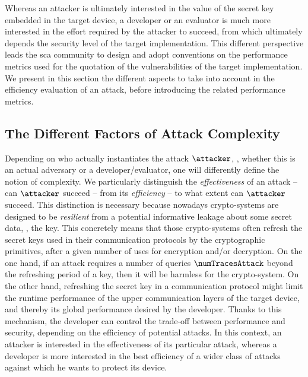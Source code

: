 Whereas an attacker is ultimately interested in the value of the secret key embedded in the target device, a developer or an evaluator is much more interested in the effort required by the attacker to succeed, from which ultimately depends the security level of the target implementation.
This different perspective leads the \gls{sca} community to design and adopt conventions on the performance metrics used for the quotation of the vulnerabilities of the target implementation.
We present in this section the different aspects to take into account in the efficiency evaluation of an attack, before introducing the related performance metrics.

\subsection{The Different Factors of Attack Complexity}
\label{sec:factors_attack_complex}

Depending on who actually instantiates the attack \(\attacker\), \ie{}, whether this is an actual adversary or a developer/evaluator, one will differently define the notion of complexity.
We particularly distinguish the \emph{effectiveness} of an attack -- \ie{} can \(\attacker\) succeed -- from its \emph{efficiency} -- \ie{} to what extent can \(\attacker\) succeed.
This distinction is necessary because nowadays crypto-systems are designed to be \emph{resilient} from a potential informative leakage about some secret data, \eg{}, the key.
This concretely means that those crypto-systems often refresh the secret keys used in their communication protocols by the cryptographic primitives, after a given number of uses for encryption and/or decryption.
On the one hand, if an attack requires a number of queries \(\numTracesAttack\) beyond the refreshing period of a key, then it will be harmless for the crypto-system.
On the other hand, refreshing the secret key in a communication protocol might limit the runtime performance of the upper communication layers of the target device, and thereby its global performance desired by the developer.
Thanks to this mechanism, the developer can control the trade-off between performance and security, depending on the efficiency of potential attacks.
In this context, an attacker is interested in the effectiveness of its particular attack, whereas a developer is more interested in the best efficiency of a wider class of attacks against which he wants to protect its device.

